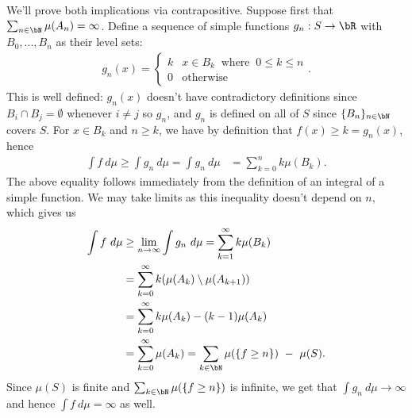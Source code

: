 \begin{homework}[e]
\begin{prf}
		We'll prove both implications via contrapositive. Suppose first that $\sum_{n \in \bN} \mu(A_n) = \infty$. Define a sequence of simple functions $g_n:S\to \bR$ with $B_0,...,B_n$ as their level sets:
		\begin{align*}
			g_n(x) =
			\begin{cases}
				k & x \in B_k ~ \text{ where } ~ 0\leq k\leq n \\
				0 &\text{otherwise}
			\end{cases}.
		\end{align*}
		This is well defined: $g_n(x)$ doesn't have contradictory definitions since $B_i \cap B_j = \emptyset$ whenever $i\neq j$ so $g_n$, and $g_n$ is defined on all of $S$ since $\{B_n\}_{n\in \bN}$ covers $S$. For $x \in B_k$ and $n \geq k$, we have by definition that $f(x) \geq k = g_n(x)$, hence
		\begin{align*}
			\int f ~d\mu \geq \int g_n ~d\mu = \int g_n ~d\mu &= \sum_{k = 0}^n k\mu(B_k).
		\end{align*}
		The above equality follows immediately from the definition of an integral of a simple function. We may take limits as this inequality doesn't depend on $n$, which gives us
		\begin{align*}
			\int f~d\mu &\geq \lim_{n\to \infty} \int g_n ~d\mu = \sum_{k=1}^\infty k\mu(B_k) \\
						&= \sum_{k=0}^\infty k(\mu(A_k) \setminus \mu(A_{k+1})) \\
						&= \sum_{k=0}^\infty k\mu(A_k) - (k-1)\mu(A_k) \\
						&= \sum_{k=0}^\infty \mu(A_k) = \sum_{k \in \bN} \mu(\{f\geq n\}) ~ - ~ \mu(S).
		\end{align*}
		Since $\mu(S)$ is finite and $\sum_{k \in \bN} \mu(\{f\geq n\})$ is infinite, we get that $\int g_n ~d\mu \to \infty$ and hence $\int f ~d\mu = \infty$ as well.

		\bigskip


\end{prf}
\end{homework}
